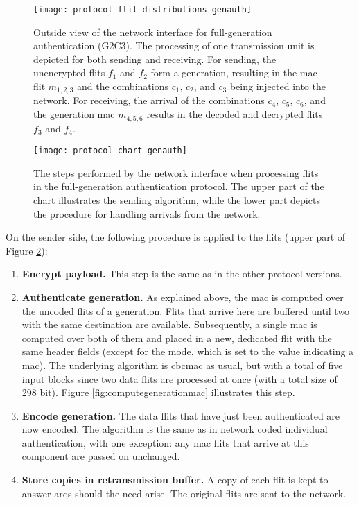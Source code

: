 \begin{figure}
    \centering
    \texttt{[image: protocol-flit-distributions-genauth]}
    \caption[Full-gen. auth., outside view]{Outside view of the network interface for full-generation authentication (G2C3). The processing of one
    transmission unit is depicted for both sending and receiving. For sending, the unencrypted flits $f_1$ and $f_2$ form a generation, resulting in
    the \gls{mac} flit $m_{1,2,3}$ and the combinations $c_1$, $c_2$, and $c_3$ being injected into the network. For receiving, the arrival of the
    combinations $c_4$, $c_5$, $c_6$, and the generation \gls{mac} $m_{4,5,6}$ results in the decoded and decrypted flits $f_3$ and $f_4$.}
    \label{fig:protflitdistgenauth}
\end{figure}

\begin{figure}
    \centering
    \texttt{[image: protocol-chart-genauth]}
    \caption[Full-gen. auth., detailed procedure]{The steps performed by the network interface when processing flits in the full-generation
    authentication protocol. The upper part of the chart illustrates the sending algorithm, while the lower part depicts the procedure for handling
    arrivals from the network.}
    \label{fig:protchartgenauth}
\end{figure}

On the sender side, the following procedure is applied to the flits (upper part of Figure \ref{fig:protchartgenauth}):
\begin{enumerate}
    \item \textbf{Encrypt payload.} This step is the same as in the other protocol versions.
    \item \textbf{Authenticate generation.} As explained above, the \gls{mac} is computed over the uncoded flits of a generation. Flits that arrive
        here are buffered until two with the same destination are available. Subsequently, a single \gls{mac} is computed over both of them and placed
        in a new, dedicated flit with the same header fields (except for the mode, which is set to the value indicating a \gls{mac}). The underlying
        algorithm is \gls{cbcmac} as usual, but with a total of five input blocks since two data flits are processed at once (with a total size of 298
        bit). Figure \vref{fig:computegenerationmac} illustrates this step.
    \item \textbf{Encode generation.} The data flits that have just been authenticated are now encoded. The algorithm is the same as in network coded
        individual authentication, with one exception: any \gls{mac} flits that arrive at this component are passed on unchanged.
    \item \textbf{Store copies in retransmission buffer.} A copy of each flit is kept to answer \glspl{arq} should the need arise. The original flits
        are sent to the network.
\end{enumerate}
\vspace{0.5\baselineskip}

